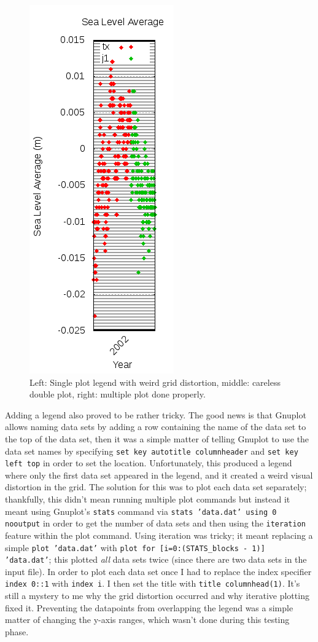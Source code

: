 \documentclass{article}
\begin{document}
\begin{figure}
\includegraphics{files/blog/2018_06_02_measuring_sea_level_averages_using_rads/2018_06_02_legend_after.png}
\caption{Left: Single plot legend with weird grid distortion, middle: careless double plot, right: multiple plot done properly.}
\end{figure}
Adding a legend also proved to be rather tricky.  The good news is that Gnuplot allows naming data sets by adding a row containing the name of the data set to the top of the data set, then it was a simple matter of telling Gnuplot to use the data set names by specifying \texttt{set key autotitle columnheader} and \texttt{set key left top} in order to set the location.  Unfortunately, this produced a legend where only the first data set appeared in the legend, and it created a weird visual distortion in the grid.  The solution for this was to plot each data set separately; thankfully, this didn't mean running multiple plot commands but instead it meant using Gnuplot's \texttt{stats} command via \texttt{stats 'data.dat' using 0 nooutput} in order to get the number of data sets and then using the \texttt{iteration} feature within the plot command.  Using iteration was tricky; it meant replacing a simple \texttt{plot 'data.dat'} with \texttt{plot for [i=0:(STATS_blocks - 1)] 'data.dat'}; this plotted \emph{all} data sets twice (since there are two data sets in the input file).  In order to plot each data set once I had to replace the index specifier \texttt{index 0::1} with \texttt{index i}.  I then set the title with \texttt{title columnhead(1)}.  It's still a mystery to me why the grid distortion occurred and why iterative plotting fixed it.  Preventing the datapoints from overlapping the legend was a simple matter of changing the y-axis ranges, which wasn't done during this testing phase.
\end{document}
